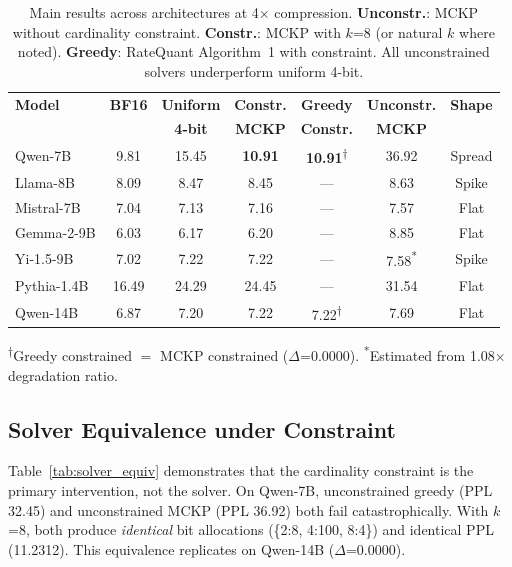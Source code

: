 \documentclass[11pt,a4paper]{article}
\begin{document}
\begin{table}[t]
\centering
\small
\caption{Main results across architectures at 4$\times$ compression. \textbf{Unconstr.}: MCKP without cardinality constraint. \textbf{Constr.}: MCKP with $k$=8 (or natural $k$ where noted). \textbf{Greedy}: RateQuant Algorithm~1 with constraint. All unconstrained solvers underperform uniform 4-bit.}
\label{tab:main}
\begin{tabular}{@{}lcccccc@{}}
\toprule
\textbf{Model} & \textbf{BF16} & \textbf{Uniform} & \textbf{Constr.} & \textbf{Greedy} & \textbf{Unconstr.} & \textbf{Shape} \\
 & & \textbf{4-bit} & \textbf{MCKP} & \textbf{Constr.} & \textbf{MCKP} & \\
\midrule
Qwen-7B & 9.81 & 15.45 & \textbf{10.91} & \textbf{10.91}\textsuperscript{$\dagger$} & 36.92 & Spread \\
Llama-8B & 8.09 & 8.47 & 8.45 & --- & 8.63 & Spike \\
Mistral-7B & 7.04 & 7.13 & 7.16 & --- & 7.57 & Flat \\
Gemma-2-9B & 6.03 & 6.17 & 6.20 & --- & 8.85 & Flat \\
Yi-1.5-9B & 7.02 & 7.22 & 7.22 & --- & 7.58\textsuperscript{*} & Spike \\
Pythia-1.4B & 16.49 & 24.29 & 24.45 & --- & 31.54 & Flat \\
Qwen-14B & 6.87 & 7.20 & 7.22 & 7.22\textsuperscript{$\dagger$} & 7.69 & Flat \\
\bottomrule
\end{tabular}

\vspace{2pt}
{\footnotesize \textsuperscript{$\dagger$}Greedy constrained $=$ MCKP constrained ($\Delta$=0.0000). \textsuperscript{*}Estimated from 1.08$\times$ degradation ratio.}
\end{table}


\subsection{Solver Equivalence under Constraint}
\label{sec:solver_equiv}

Table~\ref{tab:solver_equiv} demonstrates that the cardinality constraint is the primary intervention, not the solver.
On Qwen-7B, unconstrained greedy (PPL 32.45) and unconstrained MCKP (PPL 36.92) both fail catastrophically.
With $k$=8, both produce \emph{identical} bit allocations (\{2:8, 4:100, 8:4\}) and identical PPL (11.2312).
This equivalence replicates on Qwen-14B ($\Delta$=0.0000).
\end{document}
